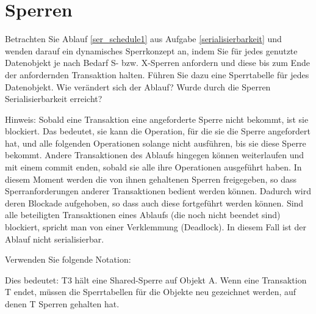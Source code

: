 \section{Sperren}
\label{Sperren}

Betrachten Sie Ablauf \ref{ser_schedule1} aus Aufgabe \ref{serialisierbarkeit} und wenden darauf ein dynamisches Sperrkonzept an, indem Sie für jedes genutzte Datenobjekt je nach Bedarf S- bzw. X-Sperren anfordern und diese bis zum Ende der anfordernden Transaktion halten. Führen Sie dazu eine Sperrtabelle für jedes Datenobjekt. Wie verändert sich der Ablauf? Wurde durch die Sperren Serialisierbarkeit erreicht?

Hinweis: Sobald eine Transaktion eine angeforderte Sperre nicht bekommt, ist sie blockiert. Das bedeutet, sie kann die Operation, für die sie die Sperre angefordert hat, und alle folgenden Operationen solange nicht ausführen, bis sie diese Sperre bekommt. Andere Transaktionen des Ablaufs hingegen können weiterlaufen und mit einem commit enden, sobald sie alle ihre Operationen ausgeführt haben. In diesem Moment werden die von ihnen gehaltenen Sperren freigegeben, so dass Sperranforderungen anderer Transaktionen bedient werden können. Dadurch wird deren Blockade aufgehoben, so dass auch diese fortgeführt werden können. Sind alle beteiligten Transaktionen eines Ablaufs (die noch nicht beendet sind) blockiert, spricht man von einer Verklemmung (Deadlock). In diesem Fall ist der Ablauf nicht serialisierbar.

\beamertxt{\pagebreak}
Verwenden Sie folgende Notation:


Dies bedeutet: T3 hält eine Shared-Sperre auf Objekt A. Wenn eine Transaktion T endet, müssen die Sperrtabellen für die Objekte neu gezeichnet werden, auf denen T Sperren gehalten hat.

